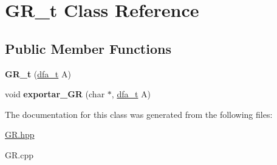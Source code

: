 \hypertarget{classGR__t}{\section{G\-R\-\_\-t Class Reference}
\label{classGR__t}
}
\subsection*{Public Member Functions}
\begin{DoxyCompactItemize}
\item 
\hypertarget{classGR__t_a91a082e16f0b6de7ddd579ea0cd8581b}{{\bfseries G\-R\-\_\-t} (\hyperlink{classdfa__t}{dfa\-\_\-t} A)}\label{classGR__t_a91a082e16f0b6de7ddd579ea0cd8581b}

\item 
\hypertarget{classGR__t_abc49d440cccd3f1379830005572f87dd}{void {\bfseries exportar\-\_\-\-G\-R} (char $\ast$, \hyperlink{classdfa__t}{dfa\-\_\-t} A)}\label{classGR__t_abc49d440cccd3f1379830005572f87dd}

\end{DoxyCompactItemize}


The documentation for this class was generated from the following files\-:\begin{DoxyCompactItemize}
\item 
\hyperlink{GR_8hpp}{G\-R.\-hpp}\item 
G\-R.\-cpp\end{DoxyCompactItemize}
